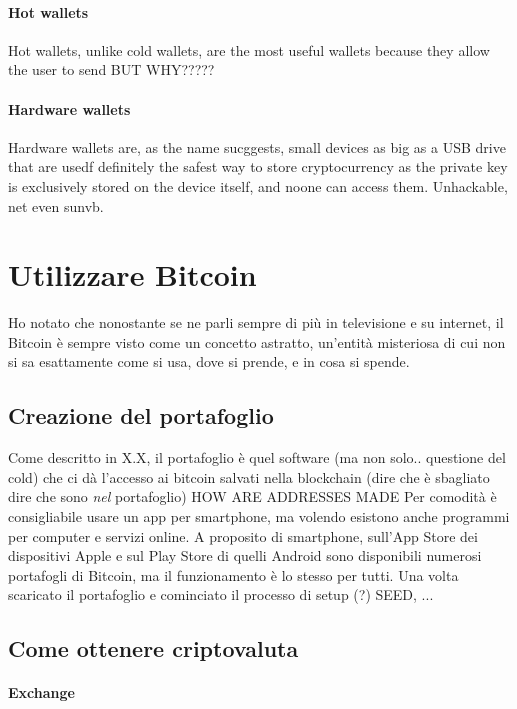 \documentclass {article}
\begin{document}
\paragraph {Hot wallets}


Hot wallets, unlike cold wallets, are the most useful wallets because they allow the user to send BUT WHY?????


\paragraph {Hardware wallets}


Hardware wallets are, as the name sucggests, small devices as big as a USB drive that are usedf
definitely the safest way to store cryptocurrency as the private key is exclusively stored on the device itself, and noone can access them. Unhackable, net even sunvb.


\section {Utilizzare Bitcoin}


Ho notato che nonostante se ne parli sempre di più in televisione e su internet, il Bitcoin è sempre visto come un concetto astratto, un'entità misteriosa di cui non si sa esattamente come si usa, dove si prende, e in cosa si spende.


\subsection {Creazione del portafoglio}


Come descritto in X.X, il portafoglio è quel software (ma non solo.. questione del cold) che ci dà l'accesso ai bitcoin salvati nella blockchain (dire che è sbagliato dire che sono \emph{nel} portafoglio)
HOW ARE ADDRESSES MADE
Per comodità è consigliabile usare un app per smartphone, ma volendo esistono anche programmi per computer e servizi online.
A proposito di smartphone, sull'App Store dei dispositivi Apple e sul Play Store di quelli Android sono disponibili numerosi portafogli di Bitcoin, ma il funzionamento è lo stesso per tutti.
Una volta scaricato il portafoglio e cominciato il processo di setup (?) SEED, ...


\subsection {Come ottenere criptovaluta}


\paragraph {Exchange}
\end{document}
